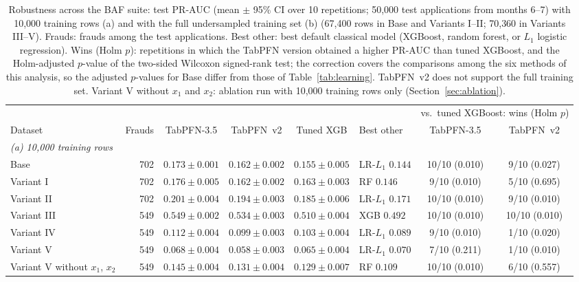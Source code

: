 \begin{table}[htbp]
\centering
\caption{Robustness across the BAF suite: test PR-AUC (mean $\pm$ 95\% CI over 10 repetitions; 50{,}000 test applications from months 6--7) with 10{,}000 training rows (a) and with the full undersampled training set (b) (67{,}400 rows in Base and Variants I--II; 70{,}360 in Variants III--V). Frauds: frauds among the test applications. Best other: best default classical model (XGBoost, random forest, or $L_1$ logistic regression). Wins (Holm $p$): repetitions in which the TabPFN version obtained a higher PR-AUC than tuned XGBoost, and the Holm-adjusted $p$-value of the two-sided Wilcoxon signed-rank test; the correction covers the comparisons among the six methods of this analysis, so the adjusted $p$-values for Base differ from those of Table~\ref{tab:learning}. TabPFN~v2 does not support the full training set. Variant V without $x_1$ and $x_2$: ablation run with 10{,}000 training rows only (Section~\ref{sec:ablation}).}
\label{tab:robustness}
\footnotesize
\begin{tabular}{l r c c c l c c}
\toprule
 & & & & & & \multicolumn{2}{c}{vs.\ tuned XGBoost: wins (Holm $p$)} \\
\cmidrule(lr){7-8}
Dataset & Frauds & TabPFN-3.5 & TabPFN~v2 & Tuned XGB & Best other & TabPFN-3.5 & TabPFN~v2 \\
\midrule
\multicolumn{8}{l}{\emph{(a) 10{,}000 training rows}} \\
Base & 702 & $0.173 \pm 0.001$ & $0.162 \pm 0.002$ & $0.155 \pm 0.005$ & LR-$L_1$ $0.144$ & 10/10 (0.010) & 9/10 (0.027) \\
Variant I & 702 & $0.176 \pm 0.005$ & $0.162 \pm 0.002$ & $0.163 \pm 0.003$ & RF $0.146$ & 9/10 (0.010) & 5/10 (0.695) \\
Variant II & 702 & $0.201 \pm 0.004$ & $0.194 \pm 0.003$ & $0.185 \pm 0.006$ & LR-$L_1$ $0.171$ & 10/10 (0.010) & 9/10 (0.010) \\
Variant III & 549 & $0.549 \pm 0.002$ & $0.534 \pm 0.003$ & $0.510 \pm 0.004$ & XGB $0.492$ & 10/10 (0.010) & 10/10 (0.010) \\
Variant IV & 549 & $0.112 \pm 0.004$ & $0.099 \pm 0.003$ & $0.103 \pm 0.004$ & LR-$L_1$ $0.089$ & 9/10 (0.010) & 1/10 (0.020) \\
Variant V & 549 & $0.068 \pm 0.004$ & $0.058 \pm 0.003$ & $0.065 \pm 0.004$ & LR-$L_1$ $0.070$ & 7/10 (0.211) & 1/10 (0.010) \\
Variant V without $x_1$, $x_2$ & 549 & $0.145 \pm 0.004$ & $0.131 \pm 0.004$ & $0.129 \pm 0.007$ & RF $0.109$ & 10/10 (0.010) & 6/10 (0.557) \\

\end{tabular}
\end{table}

